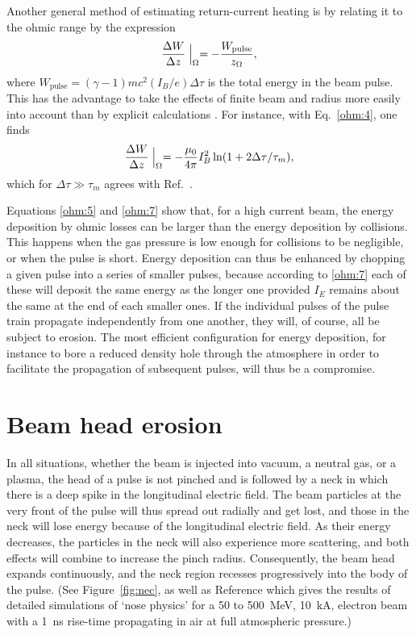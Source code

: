 \documentclass [12pt,a4paper,     ]{report} %
\begin{document}
  Another general method of estimating return-current heating is by relating it to the ohmic range by the expression \cite{LEE--1973D}
%
\begin{equation}\label{ohm:8} %
        \frac{\Delta W}{\Delta z}\Bigm|_{\Omega}
      = - \frac{W_{\text{pulse}}}{z_\Omega},
\end{equation}
%
where $W_{\text{pulse}} = (\gamma-1)mc^2 (I_B/e) \Delta \tau$ is the total energy in the beam pulse.  This has the advantage to take the effects of finite beam and radius more easily into account than by explicit calculations \cite{GERWI1975-}.   For instance, with Eq.~\eqref{ohm:4}, one finds
%
\begin{equation}\label{ohm:9} %
          \frac{\Delta W}{\Delta z}\Bigm|_{\Omega}
      = - \frac{\mu_0}{4\pi} I_B^2 \ln(1+2\Delta\tau/\tau_m),
\end{equation}
%
which for $\Delta\tau \gg \tau_m$ agrees with Ref.~\cite{GERWI1975-}.

   Equations \eqref{ohm:5} and \eqref{ohm:7} show that, for a high current beam, the energy deposition by ohmic losses can be larger than the energy deposition by collisions.  This happens when the gas pressure is low enough for collisions to be negligible, or when the pulse is short.  Energy deposition can thus be enhanced by chopping a given pulse into a series of smaller pulses, because according to \eqref{ohm:7} each of these will deposit the same energy as the longer one provided $I_E$ remains about the same at the end of each smaller ones.  If the individual pulses of the pulse train propagate independently from one another, they will, of course, all be subject to erosion.  The most efficient configuration for energy deposition, for instance to bore a reduced density hole through the atmosphere in order to facilitate the propagation of subsequent pulses, will thus be a compromise.




\section{Beam head erosion}
\label{ero:0}

In all situations, whether the beam is injected into vacuum, a neutral gas, or a plasma, the head of a pulse is not pinched and is followed by a neck in which there is a deep spike in the longitudinal electric field.  The beam particles at the very front of the pulse will thus spread out radially and get lost, and those in the neck will lose energy because of the longitudinal electric field.  As their energy decreases, the particles in the neck will also experience more scattering, and both effects will combine to increase the pinch radius.  Consequently, the beam head  expands continuously, and the neck region recesses progressively into the body of the pulse.  (See Figure~\ref{fig:nec}, as well as Reference \cite{BOUCH1988-} which gives the results of detailed simulations of `nose physics' for a 50 to 500~MeV, 10~kA, electron beam with a 1~ns rise-time propagating in air at full atmospheric pressure.)
\end{document}
